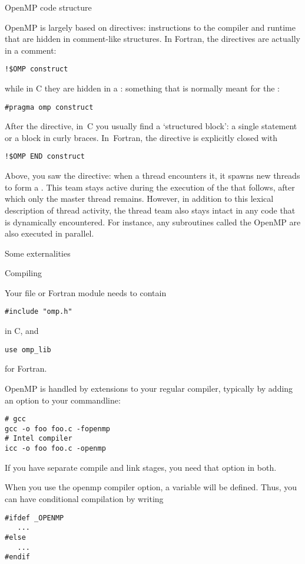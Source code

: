  {OpenMP code structure}

OpenMP is largely based on directives: instructions to the compiler
and runtime that are hidden in comment-like structures. In Fortran,
the directives are actually in a comment:
\begin{verbatim}
!$OMP construct
\end{verbatim}
while in C they are hidden in a : something that
is normally meant for the :
\begin{verbatim}
#pragma omp construct
\end{verbatim}
After the directive, in~C you usually find a `structured block':
a single statement or a block in curly braces. In~Fortran,
the directive is explicitly closed with
\begin{verbatim}
!$OMP END construct
\end{verbatim}

Above, you saw the  directive: when a thread
encounters it, it spawns new threads to form a .
This team stays active during the execution of the 
that follows, after which only the master thread remains. However,
in addition to this lexical description of thread activity, the thread team
also stays intact in any code that is dynamically encountered. For instance,
any subroutines called the OpenMP  are also executed
in parallel.

 {Some externalities}

 {Compiling}

Your file or Fortran module needs to contain
\begin{verbatim}
#include "omp.h"
\end{verbatim}
in C, and 
\begin{verbatim}
use omp_lib
\end{verbatim}
for Fortran.

OpenMP is handled by extensions to your regular compiler, typically by
adding an option to your commandline:
\begin{verbatim}
# gcc
gcc -o foo foo.c -fopenmp
# Intel compiler
icc -o foo foo.c -openmp
\end{verbatim}
If you have separate compile and link stages, you need that option in both.

When you use the openmp compiler option, a  variable 
will be defined. Thus, you can have conditional compilation by writing
\begin{verbatim}
#ifdef _OPENMP
   ...
#else
   ...
#endif
\end{verbatim}

